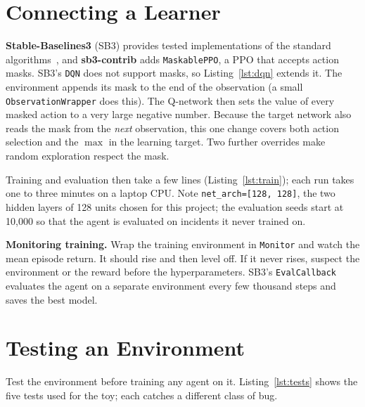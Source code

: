 \documentclass[11pt,a4paper]{article}
\begin{document}
\section{Connecting a Learner}
\label{sec:learners}

\textbf{Stable-Baselines3} (SB3) provides tested implementations of the standard algorithms~\cite{sb3}, and \textbf{sb3-contrib} adds \texttt{MaskablePPO}, a PPO that accepts action masks. SB3's \texttt{DQN} does not support masks, so Listing~\ref{lst:dqn} extends it. The environment appends its mask to the end of the observation (a small \texttt{ObservationWrapper} does this). The Q-network then sets the value of every masked action to a very large negative number. Because the target network also reads the mask from the \emph{next} observation, this one change covers both action selection and the $\max$ in the learning target. Two further overrides make random exploration respect the mask.



Training and evaluation then take a few lines (Listing~\ref{lst:train}); each run takes one to three minutes on a laptop CPU. Note \texttt{net\_arch=[128, 128]}, the two hidden layers of 128 units chosen for this project; the evaluation seeds start at 10{,}000 so that the agent is evaluated on incidents it never trained on.



\textbf{Monitoring training.} Wrap the training environment in \texttt{Monitor} and watch the mean episode return. It should rise and then level off. If it never rises, suspect the environment or the reward before the hyperparameters. SB3's \texttt{EvalCallback} evaluates the agent on a separate environment every few thousand steps and saves the best model.

\section{Testing an Environment}
\label{sec:testing}

Test the environment before training any agent on it. Listing~\ref{lst:tests} shows the five tests used for the toy; each catches a different class of bug.
\end{document}
